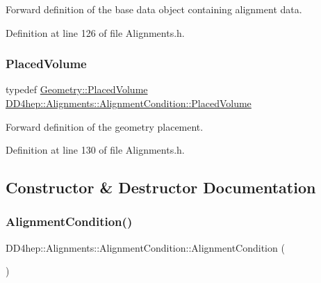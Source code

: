 Forward definition of the base data object containing alignment data. 



Definition at line 126 of file Alignments.\+h.

\hypertarget{class_d_d4hep_1_1_alignments_1_1_alignment_condition_a4d73434f31bcdf1c29d271c14b9122cb}{}\label{class_d_d4hep_1_1_alignments_1_1_alignment_condition_a4d73434f31bcdf1c29d271c14b9122cb} 
\subsubsection{\texorpdfstring{Placed\+Volume}{PlacedVolume}}
{\footnotesize\ttfamily typedef \hyperlink{class_d_d4hep_1_1_geometry_1_1_placed_volume}{Geometry\+::\+Placed\+Volume} \hyperlink{class_d_d4hep_1_1_alignments_1_1_alignment_condition_a4d73434f31bcdf1c29d271c14b9122cb}{D\+D4hep\+::\+Alignments\+::\+Alignment\+Condition\+::\+Placed\+Volume}}



Forward definition of the geometry placement. 



Definition at line 130 of file Alignments.\+h.



\subsection{Constructor \& Destructor Documentation}
\hypertarget{class_d_d4hep_1_1_alignments_1_1_alignment_condition_a47e83eec8de8934ae9787ecd328ce08e}{}\label{class_d_d4hep_1_1_alignments_1_1_alignment_condition_a47e83eec8de8934ae9787ecd328ce08e} 
\subsubsection{\texorpdfstring{Alignment\+Condition()}{AlignmentCondition()}\hspace{0.1cm}{\footnotesize\ttfamily [1/5]}}
{\footnotesize\ttfamily D\+D4hep\+::\+Alignments\+::\+Alignment\+Condition\+::\+Alignment\+Condition (\begin{DoxyParamCaption}{ }\end{DoxyParamCaption})\hspace{0.3cm}{\ttfamily [inline]}}



